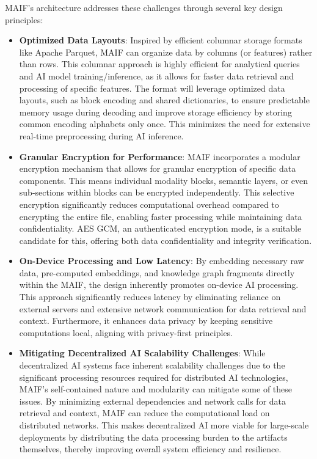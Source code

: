 \documentclass[conference]{IEEEtran}
\begin{document}
MAIF's architecture addresses these challenges through several key design principles:

\begin{itemize}[leftmargin=*]
\item \textbf{Optimized Data Layouts}: Inspired by efficient columnar storage formats like Apache Parquet, MAIF can organize data by columns (or features) rather than rows. This columnar approach is highly efficient for analytical queries and AI model training/inference, as it allows for faster data retrieval and processing of specific features\cite{ref75}. The format will leverage optimized data layouts, such as block encoding and shared dictionaries, to ensure predictable memory usage during decoding and improve storage efficiency by storing common encoding alphabets only once\cite{ref75}. This minimizes the need for extensive real-time preprocessing during AI inference.

\item \textbf{Granular Encryption for Performance}: MAIF incorporates a modular encryption mechanism that allows for granular encryption of specific data components. This means individual modality blocks, semantic layers, or even sub-sections within blocks can be encrypted independently\cite{ref64}. This selective encryption significantly reduces computational overhead compared to encrypting the entire file, enabling faster processing while maintaining data confidentiality. AES GCM, an authenticated encryption mode, is a suitable candidate for this, offering both data confidentiality and integrity verification\cite{ref64}.

\item \textbf{On-Device Processing and Low Latency}: By embedding necessary raw data, pre-computed embeddings, and knowledge graph fragments directly within the MAIF, the design inherently promotes on-device AI processing\cite{ref76}. This approach significantly reduces latency by eliminating reliance on external servers and extensive network communication for data retrieval and context. Furthermore, it enhances data privacy by keeping sensitive computations local, aligning with privacy-first principles\cite{ref76}.

\item \textbf{Mitigating Decentralized AI Scalability Challenges}: While decentralized AI systems face inherent scalability challenges due to the significant processing resources required for distributed AI technologies\cite{ref85}, MAIF's self-contained nature and modularity can mitigate some of these issues. By minimizing external dependencies and network calls for data retrieval and context, MAIF can reduce the computational load on distributed networks. This makes decentralized AI more viable for large-scale deployments by distributing the data processing burden to the artifacts themselves, thereby improving overall system efficiency and resilience.
\end{itemize}
\end{document}
